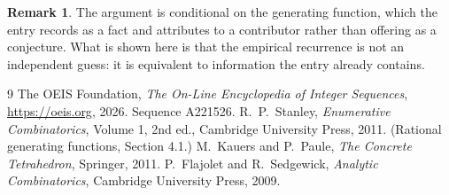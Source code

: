 \documentclass[11pt,a4paper]{article}
\theoremstyle{plain}
\theoremstyle{definition}
\newtheorem{remark}[theorem]{Remark}
\begin{document}
\begin{remark}
The argument is conditional on the generating function, which the entry records as a fact and
attributes to a contributor rather than offering as a conjecture. What is shown here is that
the empirical recurrence is not an independent guess: it is equivalent to information the
entry already contains.
\end{remark}

\begin{thebibliography}{9}
 The OEIS Foundation, \emph{The On-Line Encyclopedia of Integer
Sequences}, \url{https://oeis.org}, 2026. Sequence A221526.
 R.~P.~Stanley, \emph{Enumerative Combinatorics}, Volume 1, 2nd ed.,
Cambridge University Press, 2011. (Rational generating functions, Section 4.1.)
 M.~Kauers and P.~Paule, \emph{The Concrete Tetrahedron}, Springer, 2011.
 P.~Flajolet and R.~Sedgewick, \emph{Analytic Combinatorics}, Cambridge
University Press, 2009.
\end{thebibliography}
\end{document}
